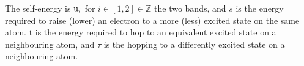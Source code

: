 \documentclass[a4paper, 12pt]{article}
\begin{document}
	The self-energy is ${\rm u}_i$ for $i \in [1,2] \in \mathbb{Z}$ the two bands, and $s$ is the energy required to raise (lower) an electron to a more (less) excited state on the same atom. t is the energy required to hop to an equivalent excited state on a neighbouring atom, and $\tau$ is the hopping to a differently excited state on a neighbouring atom.\\
\end{document}

